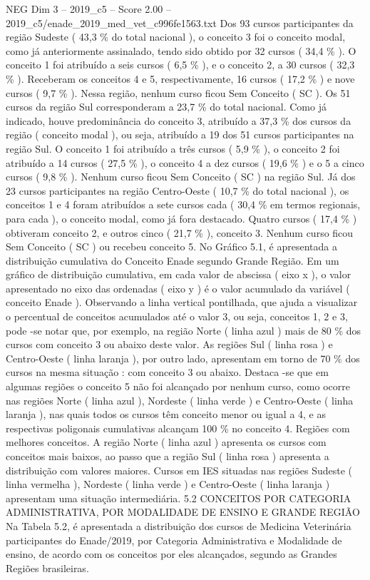 \begin{textsample}{NEG Dim 3 – 2019\_c5 – Score 2.00 – 2019\_c5/enade\_2019\_med\_vet\_c996fe1563.txt}
Dos 93 cursos participantes da região Sudeste ( 43,3 \% do total nacional ), o conceito 3 foi o conceito modal, como já anteriormente assinalado, tendo sido obtido por 32 cursos ( 34,4 \% ).
O conceito 1 foi atribuído a seis cursos ( 6,5 \% ), e o conceito 2, a 30 cursos ( 32,3 \% ).
Receberam os conceitos 4 e 5, respectivamente, 16 cursos ( 17,2 \% ) e nove cursos ( 9,7 \% ).
Nessa região, nenhum curso ficou Sem Conceito ( SC ).
Os 51 cursos da região Sul corresponderam a 23,7 \% do total nacional.
Como já indicado, houve predominância do conceito 3, atribuído a 37,3 \% dos cursos da região ( conceito modal ), ou seja, atribuído a 19 dos 51 cursos participantes na região Sul.
O conceito 1 foi atribuído a três cursos ( 5,9 \% ), o conceito 2 foi atribuído a 14 cursos ( 27,5 \% ), o conceito 4 a dez cursos ( 19,6 \% ) e o 5 a cinco cursos ( 9,8 \% ).
Nenhum curso ficou Sem Conceito ( SC ) na região Sul.
Já dos 23 cursos participantes na região Centro-Oeste ( 10,7 \% do total nacional ), os conceitos 1 e 4 foram atribuídos a sete cursos cada ( 30,4 \% em termos regionais, para cada ), o conceito modal, como já fora destacado.
Quatro cursos ( 17,4 \% ) obtiveram conceito 2, e outros cinco ( 21,7 \% ), conceito 3.
Nenhum curso ficou Sem Conceito ( SC ) ou recebeu conceito 5.
No Gráfico 5.1, é apresentada a distribuição cumulativa do Conceito Enade segundo Grande Região.
Em um gráfico de distribuição cumulativa, em cada valor de abscissa ( eixo x ), o valor apresentado no eixo das ordenadas ( eixo y ) é o valor acumulado da variável ( conceito Enade ).
Observando a linha vertical pontilhada, que ajuda a visualizar o percentual de conceitos acumulados até o valor 3, ou seja, conceitos 1, 2 e 3, pode -se notar que, por exemplo, na região Norte ( linha azul ) mais de 80 \% dos cursos com conceito 3 ou abaixo deste valor.
As regiões Sul ( linha rosa ) e Centro-Oeste ( linha laranja ), por outro lado, apresentam em torno de 70 \% dos cursos na mesma situação : com conceito 3 ou abaixo.
Destaca -se que em algumas regiões o conceito 5 não foi alcançado por nenhum curso, como ocorre nas regiões Norte ( linha azul ), Nordeste ( linha verde ) e Centro-Oeste ( linha laranja ), nas quais todos os cursos têm conceito menor ou igual a 4, e as respectivas poligonais cumulativas alcançam 100 \% no conceito 4.
Regiões com melhores conceitos.
A região Norte ( linha azul ) apresenta os cursos com conceitos mais baixos, ao passo que a região Sul ( linha rosa ) apresenta a distribuição com valores maiores.
Cursos em IES situadas nas regiões Sudeste ( linha vermelha ), Nordeste ( linha verde ) e Centro-Oeste ( linha laranja ) apresentam uma situação intermediária. 5.2 CONCEITOS POR CATEGORIA ADMINISTRATIVA, POR MODALIDADE DE ENSINO E GRANDE REGIÃO Na Tabela 5.2, é apresentada a distribuição dos cursos de Medicina Veterinária participantes do Enade/2019, por Categoria Administrativa e Modalidade de ensino, de acordo com os conceitos por eles alcançados, segundo as Grandes Regiões brasileiras.

\end{textsample}
